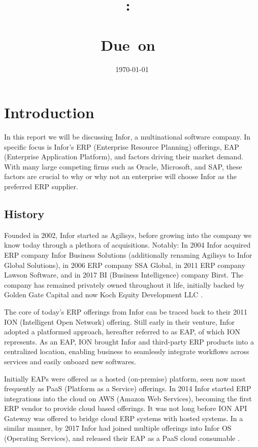 \documentclass{article}
\title{
    \vspace{2in}
    \textmd{\textbf{\hmwkClass:\ \\ \hmwkTitle}}\\
    \normalsize\vspace{0.1in}\small{Due\ on\ \hmwkDueDate}\\
    \vspace{0.1in}\Large{\textit{\paprTitle}}
    \vspace{3in}
}
\author{\hmwkAuthorName}
\date{\today}
\begin{document}
\maketitle

\pagebreak

\tableofcontents
\listoftables
\listoffigures
\newpage


\section{Introduction}
In this report we will be discussing Infor, a multinational software company. 
In specific focus is Infor's ERP (Enterprise Resource Planning) offerings, EAP (Enterprise Application Platform), and factors driving their market demand. 
With many large competing firms such as Oracle, Microsoft, and SAP, these factors are crucial to why or why not an enterprise will choose Infor as the preferred ERP supplier. 

\subsection{History}

Founded in 2002, Infor started as Agilisys, before growing into the company we know today through a plethora of acquisitions.
Notably: In 2004 Infor acquired ERP company Infor Business Solutions (additionally renaming Agilisys to Infor Global Solutions), in 2006 ERP company SSA Global, in 2011 ERP company Lawson Software, and in 2017 BI (Business Intelligence) company Birst.
The company has remained privately owned throughout it life, initially backed by Golden Gate Capital and now Koch Equity Development LLC \cite{wikipedia_infor}. 

The core of today's ERP offerings from Infor can be traced back to their 2011 ION (Intelligent Open Network) offering. 
Still early in their venture, Infor adopted a platformed approach, hereafter referred to as EAP, of which ION represents.
As an EAP, ION brought Infor and third-party ERP products into a centralized location, enabling business to seamlessly integrate workflows across services and easily onboard new softwares. 

Initially EAPs were offered as a hosted (on-premise) platform, seen now most frequently as PaaS (Platform as a Service) offerings. 
In 2014 Infor started ERP integrations into the cloud on AWS (Amazon Web Services), becoming the first ERP vendor to provide cloud based offerings.
It was not long before ION API Gateway was offered to bridge cloud ERP systems with hosted systems.
In a similar manner, by 2017 Infor had joined multiple offerings into Infor OS (Operating Services), and released their EAP as a PaaS cloud consumable \cite{infor_os_next_gen}.
\end{document}
